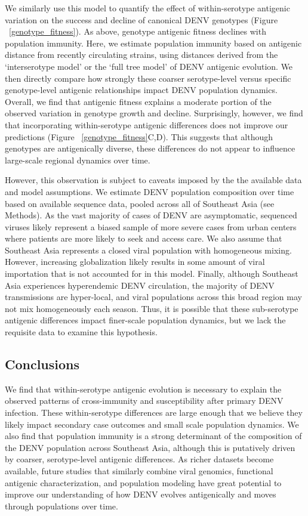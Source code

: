 \documentclass[11pt,oneside,letterpaper]{article}
\begin{document}
We similarly use this model to quantify the effect of within-serotype antigenic variation on the success and decline of canonical DENV genotypes (Figure ~\ref{genotype_fitness}).
As above, genotype antigenic fitness declines with population immunity.
Here, we estimate population immunity based on antigenic distance from recently circulating strains, using distances derived from the `interserotype model' or the `full tree model' of DENV antigenic evolution.
We then directly compare how strongly these coarser serotype-level versus specific genotype-level antigenic relationships impact DENV population dynamics.
Overall, we find that antigenic fitness explains a moderate portion of the observed variation in genotype growth and decline.
Surprisingly, however, we find that incorporating within-serotype antigenic differences does not improve our predictions (Figure ~\ref{genotype_fitness}C,D).
This suggests that although genotypes are antigenically diverse, these differences do not appear to influence large-scale regional dynamics over time.

However, this observation is subject to caveats imposed by the the available data and model assumptions.
We estimate DENV population composition over time based on available sequence data, pooled across all of Southeast Asia (see Methods).
As the vast majority of cases of DENV are asymptomatic, sequenced viruses likely represent a biased sample of more severe cases from urban centers where patients are more likely to seek and access care.
We also assume that Southeast Asia represents a closed viral population with homogeneous mixing.
However, increasing globalization likely results in some amount of viral importation that is not accounted for in this model.
Finally, although Southeast Asia experiences hyperendemic DENV circulation, the majority of DENV transmissions are hyper-local, and viral populations across this broad region may not mix homogeneously each season.
Thus, it is possible that these sub-serotype antigenic differences impact finer-scale population dynamics, but we lack the requisite data to examine this hypothesis.

\subsection*{Conclusions}
We find that within-serotype antigenic evolution is necessary to explain the observed patterns of cross-immunity and susceptibility after primary DENV infection.
These within-serotype differences are large enough that we believe they likely impact secondary case outcomes and small scale population dynamics.
We also find that population immunity is a strong determinant of the composition of the DENV population across Southeast Asia, although this is putatively driven by coarser, serotype-level antigenic differences.
As richer datasets become available, future studies that similarly combine viral genomics, functional antigenic characterization, and population modeling have great potential to improve our understanding of how DENV evolves antigenically and moves through populations over time.
\end{document}
